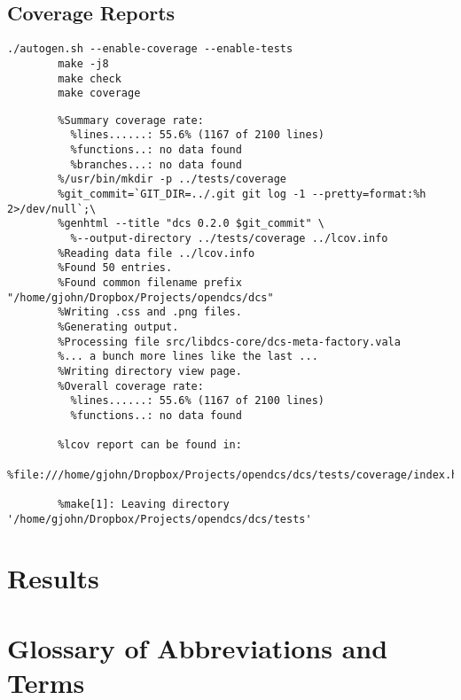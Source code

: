 \documentclass[11pt]{article}
\begin{document}
    \subsection{Coverage Reports}\label{sec:test-cov}

      \begin{lstlisting}[caption={Generating Coverage Reports},label={lst:test-cov}]
        ./autogen.sh --enable-coverage --enable-tests
        make -j8
        make check
        make coverage
      \end{lstlisting}

      \begin{lstlisting}[caption={Coverage Summary},label={lst:test-cov-summary}]
        %Writing data to ../lcov.info
        %Summary coverage rate:
          %lines......: 55.6% (1167 of 2100 lines)
          %functions..: no data found
          %branches...: no data found
        %/usr/bin/mkdir -p ../tests/coverage
        %git_commit=`GIT_DIR=../.git git log -1 --pretty=format:%h 2>/dev/null`;\
        %genhtml --title "dcs 0.2.0 $git_commit" \
          %--output-directory ../tests/coverage ../lcov.info
        %Reading data file ../lcov.info
        %Found 50 entries.
        %Found common filename prefix "/home/gjohn/Dropbox/Projects/opendcs/dcs"
        %Writing .css and .png files.
        %Generating output.
        %Processing file src/libdcs-core/dcs-meta-factory.vala
        %... a bunch more lines like the last ...
        %Writing directory view page.
        %Overall coverage rate:
          %lines......: 55.6% (1167 of 2100 lines)
          %functions..: no data found

        %lcov report can be found in:
        %file:///home/gjohn/Dropbox/Projects/opendcs/dcs/tests/coverage/index.html

        %make[1]: Leaving directory '/home/gjohn/Dropbox/Projects/opendcs/dcs/tests'
      \end{lstlisting}

  \section{Results}\label{sec:res}


  \newpage
  \addappheadtotoc%
  \appendix
  \appendixpage%

  \section{Glossary of Abbreviations and Terms}\label{app:glossary}
\end{document}
